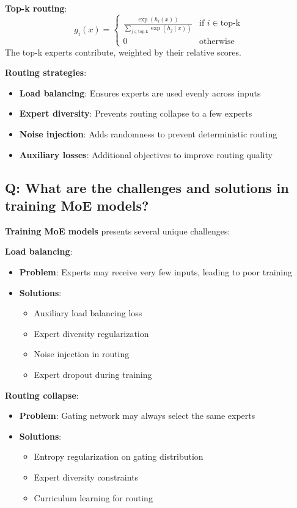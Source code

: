 \textbf{Top-k routing}:
\[
g_i(x) = \begin{cases}
\frac{\exp(h_i(x))}{\sum_{j \in \text{top-k}} \exp(h_j(x))} & \text{if } i \in \text{top-k} \\
0 & \text{otherwise}
\end{cases}
\]
The top-k experts contribute, weighted by their relative scores.

\textbf{Routing strategies}:
\begin{itemize}
	\item \textbf{Load balancing}: Ensures experts are used evenly across inputs
	\item \textbf{Expert diversity}: Prevents routing collapse to a few experts
	\item \textbf{Noise injection}: Adds randomness to prevent deterministic routing
	\item \textbf{Auxiliary losses}: Additional objectives to improve routing quality
\end{itemize}

\subsection*{Q: What are the challenges and solutions in training MoE models?}
\textbf{Training MoE models} presents several unique challenges:

\textbf{Load balancing}:
\begin{itemize}
	\item \textbf{Problem}: Experts may receive very few inputs, leading to poor training
	\item \textbf{Solutions}: 
	\begin{itemize}
		\item Auxiliary load balancing loss
		\item Expert diversity regularization
		\item Noise injection in routing
		\item Expert dropout during training
	\end{itemize}
\end{itemize}

\textbf{Routing collapse}:
\begin{itemize}
	\item \textbf{Problem}: Gating network may always select the same experts
	\item \textbf{Solutions}:
	\begin{itemize}
		\item Entropy regularization on gating distribution
		\item Expert diversity constraints
		\item Curriculum learning for routing
	\end{itemize}
\end{itemize}

